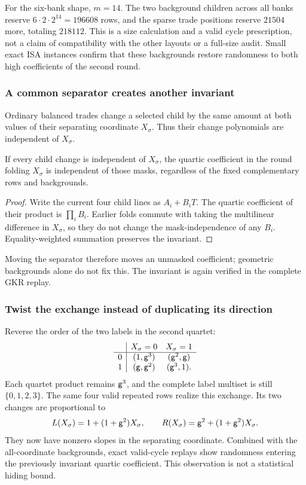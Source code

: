 For the six-bank shape, $m=14$. The two background children across all banks reserve $6\cdot2\cdot2^{14}=196608$ rows, and the sparse trade positions reserve $21504$ more, totaling $218112$. This is a size calculation and a valid cycle prescription, not a claim of compatibility with the other layouts or a full-size audit. Small exact ISA instances confirm that these backgrounds restore randomness to both high coefficients of the second round.

\subsubsection{A common separator creates another invariant}

Ordinary balanced trades change a selected child by the same amount at both values of their separating coordinate $X_\sigma$. Thus their change polynomials are independent of $X_\sigma$.

\begin{lemma}
If every child change is independent of $X_\sigma$, the quartic coefficient in the round folding $X_\sigma$ is independent of those masks, regardless of the fixed complementary rows and backgrounds.
\end{lemma}
\begin{proof}
Write the current four child lines as $A_i+B_iT$. The quartic coefficient of their product is $\prod_i B_i$. Earlier folds commute with taking the multilinear difference in $X_\sigma$, so they do not change the mask-independence of any $B_i$. Equality-weighted summation preserves the invariant.
\end{proof}

Moving the separator therefore moves an unmasked coefficient; geometric backgrounds alone do not fix this. The invariant is again verified in the complete GKR replay.

\subsubsection{Twist the exchange instead of duplicating its direction}

Reverse the order of the two labels in the second quartet:
\[
\begin{array}{c|cc}
 &X_\sigma=0&X_\sigma=1\\ \hline
0 &(1,\mathsf{g}^3)&(\mathsf{g}^2,\mathsf{g})\\
1 &(\mathsf{g},\mathsf{g}^2)&(\mathsf{g}^3,1).
\end{array}
\]
Each quartet product remains $\mathsf{g}^3$, and the complete label multiset is still $\{0,1,2,3\}$. The same four valid repeated rows realize this exchange. Its two changes are proportional to
\[
 L(X_\sigma)=1+(1+\mathsf{g}^2)X_\sigma,
 \qquad R(X_\sigma)=\mathsf{g}^2+(1+\mathsf{g}^2)X_\sigma.
\]
They now have nonzero slopes in the separating coordinate. Combined with the all-coordinate backgrounds, exact valid-cycle replays show randomness entering the previously invariant quartic coefficient. This observation is not a statistical hiding bound.

